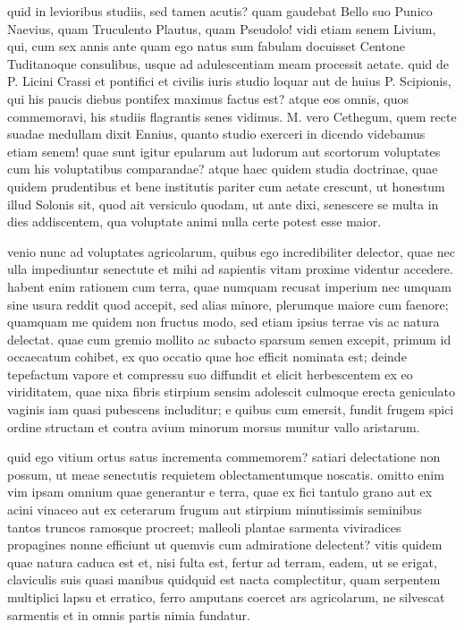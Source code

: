  quid in levioribus studiis, sed tamen acutis? quam gaudebat Bello suo Punico Naevius, quam Truculento Plautus, quam Pseudolo! vidi etiam senem Livium, qui, cum sex annis ante quam ego natus sum fabulam docuisset Centone Tuditanoque consulibus, usque ad adulescentiam meam processit aetate. quid de P. Licini Crassi et pontifici et civilis iuris studio loquar aut de huius P. Scipionis, qui his paucis diebus pontifex maximus factus est? atque eos omnis, quos commemoravi, his studiis flagrantis senes vidimus. M. vero Cethegum, quem recte suadae medullam dixit Ennius, quanto studio exerceri in dicendo videbamus etiam senem! quae sunt igitur epularum aut ludorum aut scortorum voluptates cum his voluptatibus comparandae? atque haec quidem studia doctrinae, quae quidem prudentibus et bene institutis pariter cum aetate crescunt, ut honestum illud Solonis sit, quod ait versiculo quodam, ut ante dixi, senescere se multa in dies addiscentem, qua voluptate animi nulla certe potest esse maior.

 venio nunc ad voluptates agricolarum, quibus ego incredibiliter delector, quae nec ulla impediuntur senectute et mihi ad sapientis vitam proxime videntur accedere. habent enim rationem cum terra, quae numquam recusat imperium nec umquam sine usura reddit quod accepit, sed alias minore, plerumque maiore cum faenore; quamquam me quidem non fructus modo, sed etiam ipsius terrae vis ac natura delectat. quae cum gremio mollito ac subacto sparsum semen excepit, primum id occaecatum cohibet, ex quo occatio quae hoc efficit nominata est; deinde tepefactum vapore et compressu suo diffundit et elicit herbescentem ex eo viriditatem, quae nixa fibris stirpium sensim adolescit culmoque erecta geniculato vaginis iam quasi pubescens includitur; e quibus cum emersit, fundit frugem spici ordine structam et contra avium minorum morsus munitur vallo aristarum.

 quid ego vitium ortus satus incrementa commemorem? satiari delectatione non possum, ut meae senectutis requietem oblectamentumque noscatis. omitto enim vim ipsam omnium quae generantur e terra, quae ex fici tantulo grano aut ex acini vinaceo aut ex ceterarum frugum aut stirpium minutissimis seminibus tantos truncos ramosque procreet; malleoli plantae sarmenta viviradices propagines nonne efficiunt ut quemvis cum admiratione delectent? vitis quidem quae natura caduca est et, nisi fulta est, fertur ad terram, eadem, ut se erigat, claviculis suis quasi manibus quidquid est nacta complectitur, quam serpentem multiplici lapsu et erratico, ferro amputans coercet ars agricolarum, ne silvescat sarmentis et in omnis partis nimia fundatur.

